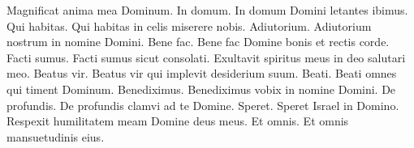 \begin{multicols*}{2}
 Magnificat anima mea Dominum.
 In domum.
 In domum Domini letantes ibimus.
 Qui habitas.
 Qui habitas in celis miserere nobis.
 Adiutorium.
 Adiutorium nostrum in nomine Domini.
 Bene fac.
 Bene fac Domine bonis et rectis corde.
 Facti sumus.
 Facti sumus sicut consolati.
 Exultavit spiritus meus in deo salutari meo.
 Beatus vir.
 Beatus vir qui implevit desiderium suum.
 Beati.
 Beati omnes qui timent Dominum.
 Benediximus.
 Benediximus vobix in nomine Domini.
 De profundis.
 De profundis clamvi ad te Domine.
 Speret.
 Speret Israel in Domino.
 Respexit humilitatem meam Domine deus meus.
 Et omnis.
 Et omnis mansuetudinis eius.

\end{multicols*}
